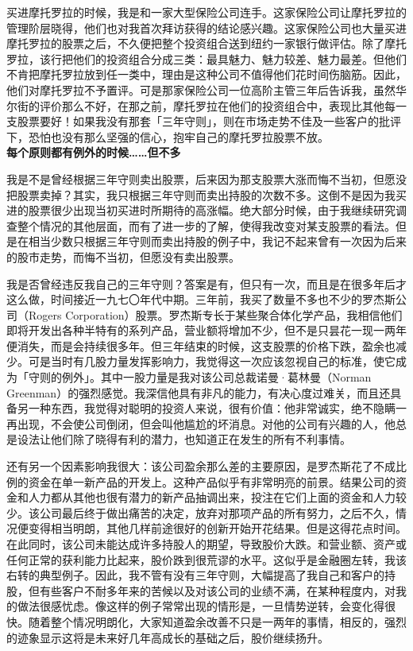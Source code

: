 \documentclass[UTF8,a4paper,zihao=-4,fontset = windows]{ctexart} %
\begin{document}
买进摩托罗拉的时候，我是和一家大型保险公司连手。这家保险公司让摩托罗拉的管理阶层晓得，他们也对我首次拜访获得的结论感兴趣。这家保险公司也大量买进摩托罗拉的股票之后，不久便把整个投资组合送到纽约一家银行做评估。除了摩托罗拉，该行把他们的投资组合分成三类：最具魅力、魅力较差、魅力最差。但他们不肯把摩托罗拉放到任一类中，理由是这种公司不值得他们花时间伤脑筋。因此，他们对摩托罗拉不予置评。可是那家保险公司一位高阶主管三年后告诉我，虽然华尔街的评价那么不好，在那之前，摩托罗拉在他们的投资组合中，表现比其他每一支股票要好！如果我没有那套「三年守则」，则在市场走势不佳及一些客户的批评下，恐怕也没有那么坚强的信心，抱牢自己的摩托罗拉股票不放。
\\

\textbf{每个原则都有例外的时候……但不多}


我是不是曾经根据三年守则卖出股票，后来因为那支股票大涨而悔不当初，但愿没把股票卖掉？其实，我只根据三年守则而卖出持股的次数不多。这倒不是因为我买进的股票很少出现当初买进时所期待的高涨幅。绝大部分时候，由于我继续研究调查整个情况的其他层面，而有了进一步的了解，使得我改变对某支股票的看法。但是在相当少数只根据三年守则而卖出持股的例子中，我记不起来曾有一次因为后来的股市走势，而悔不当初，但愿没有卖出股票。

我是否曾经违反我自己的三年守则？答案是有，但只有一次，而且是在很多年后才这么做，时间接近一九七〇年代中期。三年前，我买了数量不多也不少的罗杰斯公司（Rogers Corporation）股票。罗杰斯专长于某些聚合体化学产品，我相信他们即将开发出各种半特有的系列产品，营业额将增加不少，但不是只昙花一现一两年便消失，而是会持续很多年。但三年结束的时候，这支股票的价格下跌，盈余也减少。可是当时有几股力量发挥影响力，我觉得这一次应该忽视自己的标准，使它成为「守则的例外」。其中一股力量是我对该公司总裁诺曼·葛林曼（Norman Greenman）的强烈感觉。我深信他具有非凡的能力，有决心度过难关，而且还具备另一种东西，我觉得对聪明的投资人来说，很有价值：他非常诚实，绝不隐瞒一再出现，不会使公司倒闭，但会叫他尴尬的坏消息。对他的公司有兴趣的人，他总是设法让他们除了晓得有利的潜力，也知道正在发生的所有不利事情。

还有另一个因素影响我很大：该公司盈余那么差的主要原因，是罗杰斯花了不成比例的资金在单一新产品的开发上。这种产品似乎有非常明亮的前景。结果公司的资金和人力都从其他也很有潜力的新产品抽调出来，投注在它们上面的资金和人力较少。该公司最后终于做出痛苦的决定，放弃对那项产品的所有努力，之后不久，情况便变得相当明朗，其他几样前途很好的创新开始开花结果。但是这得花点时间。在此同时，该公司未能达成许多持股人的期望，导致股价大跌。和营业额、资产或任何正常的获利能力比起来，股价跌到很荒谬的水平。这似乎是金融圈左转，我该右转的典型例子。因此，我不管有没有三年守则，大幅提高了我自己和客户的持股，但有些客户不耐多年来的苦候以及对该公司的业绩不满，在某种程度内，对我的做法很感忧虑。像这样的例子常常出现的情形是，一旦情势逆转，会变化得很快。随着整个情况明朗化，大家知道盈余改善不只是一两年的事情，相反的，强烈的迹象显示这将是未来好几年高成长的基础之后，股价继续扬升。
\\
\end{document}

